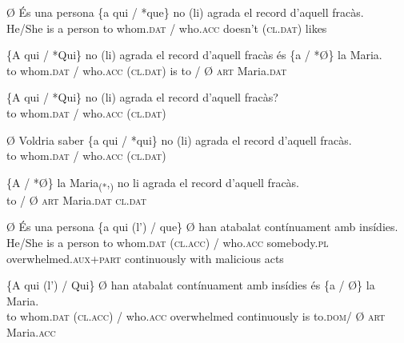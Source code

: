 \documentclass[output=paper,colorlinks,citecolor=brown,nonflat,modfonts]{langsci/langscibook}
\begin{document}
 

\ea%
 \label{ex:royo:15}
 
 \ea\label{ex:royo:15a} Ø És una persona \{a qui / *que\} no (li) agrada el record d’aquell fracàs.\\
  He/She is a person to whom.\textsc{dat} / who.\textsc{acc} doesn’t (\textsc{cl.dat}) likes\\
\glt {}
 
 \ex \label{ex:royo:15b}
 \gll  \{A qui / *Qui\} no (li) agrada el record d’aquell fracàs és \{a / *Ø\} la Maria.\\
  to whom.\textsc{dat} / who.\textsc{acc} (\textsc{cl.dat}) is to / Ø \textsc{art} Maria.\textsc{dat} \\
\glt {}
 
 
 
 \ex \label{ex:royo:15c}
 \gll \{A qui / *Qui\} no (li) agrada el record d’aquell fracàs?\\
 to whom.\textsc{dat} / who.\textsc{acc} (\textsc{cl.dat}) \\
\glt {}
 
 \ex \label{ex:royo:15d}
 \gll Ø Voldria saber \{a qui / *qui\} no (li) agrada el record d’aquell fracàs.\\
  to whom.\textsc{dat} / who.\textsc{acc} (\textsc{cl.dat}) \\
\glt {}
 
 \ex \label{ex:royo:15e}
 \gll \{A / *Ø\} la Maria\textsubscript{(*},\textsubscript{)} no li agrada el record d’aquell fracàs.\\
 to / Ø \textsc{art} Maria.\textsc{dat} \textsc{cl.dat} \\
\glt {}
 
 \z
 \z

 
\ea%
 \label{ex:royo:16}
 \ea \label{ex:royo:16a}
 \gll Ø És una persona \{a qui (l’) / que\} Ø han atabalat contínuament amb insídies.\\
 He/She is a person to whom.\textsc{dat} (\textsc{cl.acc}) / who.\textsc{acc} somebody.\textsc{pl} overwhelmed.\textsc{aux}+\textsc{part} continuously with malicious acts\\
\glt {}
 
 \ex \label{ex:royo:16b}
	\gll \{A qui (l’) / Qui\} Ø han atabalat contínuament amb insídies és \{a / Ø\} la Maria.\\
	 to whom.\textsc{dat} (\textsc{cl.acc}) / who.\textsc{acc} overwhelmed continuously is to.\textsc{dom}/ Ø \textsc{art} Maria.\textsc{acc}\\
	\glt {} 
	
\end{document}
